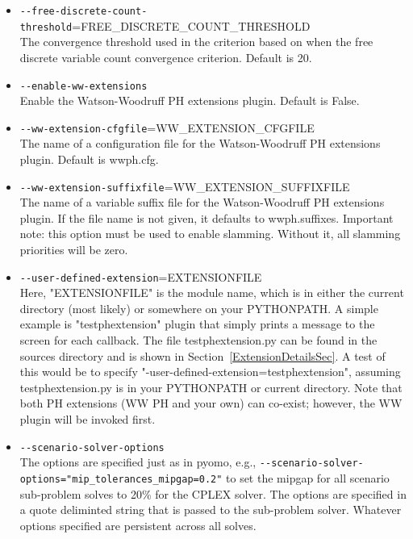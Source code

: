 \begin{itemize}
  \item \verb|--free-discrete-count-threshold|=FREE\_DISCRETE\_COUNT\_THRESHOLD \\
  The convergence threshold used in the criterion based on when the free
  discrete variable count convergence criterion. Default is 20.

  \item \verb|--enable-ww-extensions|                                                                                                                                          \\
  Enable the Watson-Woodruff PH extensions plugin. Default is False.

  \item \verb|--ww-extension-cfgfile|=WW\_EXTENSION\_CFGFILE                 \\
  The name of a configuration file for the Watson-Woodruff PH extensions plugin.
  Default is wwph.cfg.

  \item \verb|--ww-extension-suffixfile|=WW\_EXTENSION\_SUFFIXFILE           \\
  The name of a variable suffix file for the Watson-Woodruff PH extensions
  plugin. If the file name is not given, it defaults to wwph.suffixes. 
Important note: this option must
be used to enable slamming. Without it, all slamming priorities will
be zero.

  \item \verb|--user-defined-extension|=EXTENSIONFILE                        \\
  Here, "EXTENSIONFILE" is the module name, which is in either the current
  directory (most likely) or somewhere on your PYTHONPATH. A simple example is
  "testphextension" plugin that simply prints a message to the screen for each
  callback. The file testphextension.py can be found in the sources directory
  and is shown in Section~\ref{ExtensionDetailsSec}. A test of this would be to
  specify "-user-defined-extension=testphextension", assuming testphextension.py
  is in your PYTHONPATH or current directory. Note that both PH extensions (WW
  PH and your own) can co-exist; however, the WW plugin will be invoked first.

  \item \verb|--scenario-solver-options|                                     \\
  The options are specified just as in pyomo, e.g.,
  \verb|--scenario-solver-options="mip_tolerances_mipgap=0.2"| to set the mipgap
  for all scenario sub-problem solves to 20\% for the CPLEX solver. The options
  are specified in a quote deliminted string that is passed to the sub-problem
  solver. Whatever options specified are persistent across all solves.


\end{itemize}
